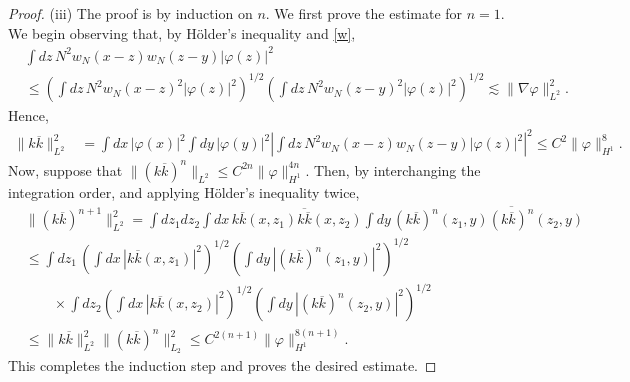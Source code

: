 \documentclass[11pt,a4paper]{scrartcl} %
\begin{document}
\begin{proof}
  (iii) The proof is by induction on $n$. We first prove the estimate for
  $n=1$. We begin observing that, by H\"older's inequality and \eqref{w},
  \begin{equation}
    \begin{aligned}
      & \int dz \, N^2 w_N(x-z) w_N(z-y) |\varphi(z)|^2 \\
      & \le \left( \int dz \, N^2 w_N(x-z)^2 |\varphi(z)|^2 \right)^{1/2} \left(
      \int dz \, N^2 w_N(z-y)^2 |\varphi(z)|^2 \right)^{1/2} \apprle \| \nabla
      \varphi \|_{L^2}^2.
    \end{aligned}
    \label{ww}
  \end{equation}
  Hence,
  \begin{align*}
    \| k \overline{k} \|_{L^2}^2 & = \int dx \, |\varphi(x)|^2 \int dy \,
    |\varphi(y)|^2 \left| \int dz \, N^2 w_N(x-z) w_N(z-y) |\varphi(z)|^2
    \right|^2 \le C^2 \| \varphi \|_{H^1}^8.
  \end{align*}
  Now, suppose that $\| (k \overline{k})^n \|_{L^2} \le C^{2n} \| \varphi
  \|_{H^1}^{4n}$. Then, by interchanging the integration order, and applying
  H\"older's inequality twice,
  \begin{align*}
    & \| (k \overline{k})^{n+1} \|_{L^2}^2 = \int dz_1 dz_2 \int dx \,
    k\overline{k}(x,z_1) \overline{ k \overline{k}}(x,z_2) \int dy \,
    (k\overline{k})^n(z_1,y) \overline{ (k \overline{k})^n}(z_2,y) \\
    & \le \int dz_1 \, \left( \int dx \, | k\overline{k}(x,z_1)|^2
    \right)^{1/2} \left( \int dy \, | (k\overline{k})^n(z_1,y)|^2
    \right)^{1/2} \\
    & \qquad \times \int dz_2 \left( \int dx \, | k\overline{k}(x,z_2)|^2
    \right)^{1/2} \left( \int dy \, | (k\overline{k})^n(z_2,y)|^2
    \right)^{1/2} \\
    & \le \| k \overline{k} \|_{L^2}^2 \| (k \overline{k})^n \|_{L_2}^2 \le
    C^{2(n+1)} \| \varphi \|_{H^1}^{8(n+1)}.
  \end{align*}
  This completes the induction step and proves the desired estimate.



\end{proof}
\end{document}
